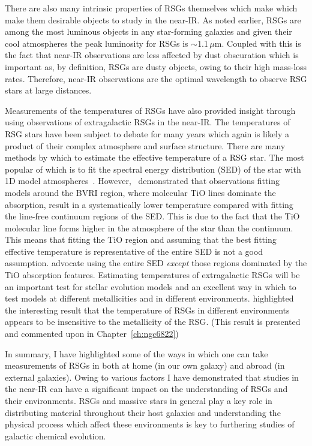There are also many intrinsic properties of RSGs themselves which make  which make them desirable objects to study in the near-IR.
As noted earlier, RSGs are among the most luminous objects in any star-forming galaxies and given their cool atmospheres the peak luminosity for RSGs is $\sim$1.1\,$\mu$m.
Coupled with this is the fact that near-IR observations are less affected by dust obscuration which is important as, by definition, RSGs are dusty objects, owing to their high mass-loss rates.
Therefore, near-IR observations are the optimal wavelength to observe RSG stars at large distances.

Measurements of the temperatures of RSGs have also provided insight through using observations of extragalactic RSGs in the near-IR.
The temperatures of RSG stars have been subject to debate for many years which again is likely a product of their complex atmosphere and surface structure.
There are many methods by which to estimate the effective temperature of a RSG star.
The most popular of which is to fit the spectral energy distribution (SED) of the star with 1D model atmospheres~\citep{Levesque05,Levesque06}.
However,~\cite{2013ApJ...767....3D} demonstrated that observations fitting models around the BVRI region, where molecular TiO lines dominate the absorption, result in a systematically lower temperature compared with fitting the line-free continuum regions of the SED.
This is due to the fact that the TiO molecular line forms higher in the atmosphere of the star than the continuum.
This means that fitting the TiO region and assuming that the best fitting effective temperature is representative of the entire SED is not a good assumption.
\cite{2013ApJ...767....3D} advocate using the entire SED \textit{except} those regions dominated by the TiO absorption features.
Estimating temperatures of extragalactic RSGs will be an important test for stellar evolution models and an excellent way in which to test models at different metallicities and in different environments.
\cite{2015ApJ...803...14P} highlighted the interesting result that the temperature of RSGs in different environments appears to be insensitive to the metallicity of the RSG. (This result is presented and commented upon in Chapter~\ref{ch:ngc6822})

In summary, I have highlighted some of the ways in which one can take measurements of RSGs in both at home (in our own galaxy) and abroad (in external galaxies).
Owing to various factors I have demonstrated that studies in the near-IR can have a significant impact on the understanding of RSGs and their environments.
RSGs and massive stars in general play a key role in distributing material throughout their host galaxies and understanding the physical process which affect these environments is key to furthering studies of galactic chemical evolution.




